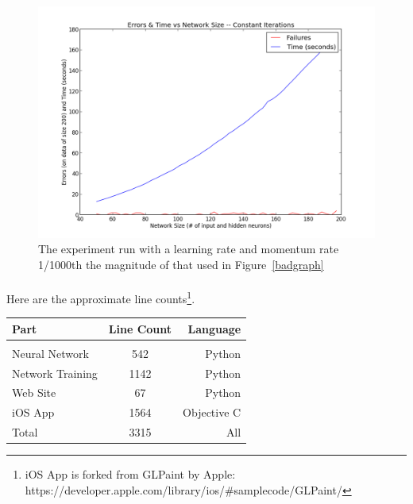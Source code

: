 \documentclass{article}
\begin{document}
    \begin{figure}
        \centering
        \includegraphics[scale=0.5]{images/good_learning.png}
        \caption{The experiment run with a learning rate and momentum rate 
            1/1000th the magnitude of that used in Figure~\ref{badgraph}}
        \label{goodgraph}
    \end{figure}

    \paragraph{}Here are the approximate line 
    counts\footnote{iOS App is forked from GLPaint by Apple: 
    https://developer.apple.com/library/ios/\#samplecode/GLPaint/}. \\

    \begin{tabular}{ l c r }
        Part & Line Count & Language \\
        \hline \\
        Neural Network & 542 & Python \\
        Network Training & 1142 & Python \\
        Web Site & 67 & Python \\
        iOS App & 1564 & Objective C \\
        Total & 3315 & All \\
    \end{tabular}
\end{document}
